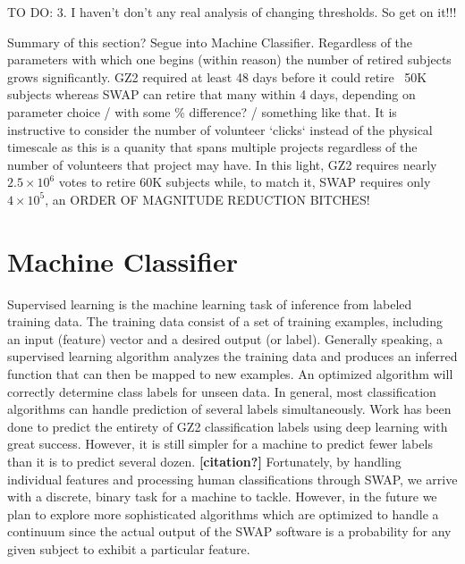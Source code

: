 \documentclass[twocolumn]{aastex6}
\begin{document}
{\color{red} TO DO: 3. I haven't don't any real analysis of changing thresholds. So get on it!!!}

Summary of this section? Segue into Machine Classifier. Regardless of the parameters
with which one begins (within reason) the number of retired subjects grows significantly. 
GZ2 required at least 48 days before it could retire ~50K subjects whereas SWAP
can retire that many within 4 days, depending on parameter choice / with some 
\% difference? / something like that. It is instructive to consider the number of
volunteer `clicks` instead of the physical timescale as this is a quanity that 
spans multiple projects regardless of the number of volunteers that project may
have. In this light, GZ2 requires nearly $2.5\times10^6$ votes to retire 60K
subjects while, to match it, SWAP requires only $4\times10^5$, an ORDER OF MAGNITUDE REDUCTION BITCHES! 



\section{Machine Classifier} \label{sec:machine}

Supervised learning is the machine learning task of inference from labeled 
training data. The training data consist of a set of training examples, including
an input (feature) vector and a desired output (or label).  Generally speaking,
a supervised learning algorithm analyzes the training data and produces an inferred 
function that can then be mapped to new examples. An optimized algorithm will 
correctly determine class labels for unseen data. In general, most classification 
algorithms can handle prediction of several labels simultaneously. Work has been
done to predict the entirety of GZ2 classification labels using deep learning 
\citep{Dieleman2015} with great success. However, it is still simpler for a machine
to predict fewer labels than it is to predict several dozen. \textbf{[citation?]} 
Fortunately, by handling individual features and processing human classifications
through SWAP, we arrive with a discrete, binary task for a machine to tackle.
However, in the future we plan to explore more sophisticated algorithms which 
are optimized to handle a continuum since the actual output of the SWAP software
is a probability for any given subject to exhibit a particular feature. 
\end{document}
